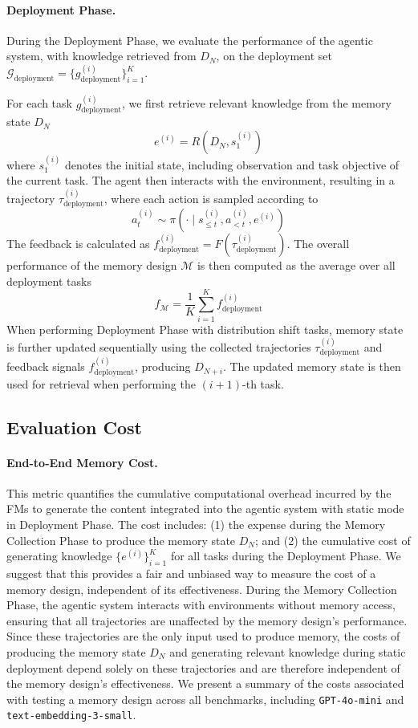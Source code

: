 \documentclass{article}
\theoremstyle{plain}
\theoremstyle{definition}
\theoremstyle{remark}
\begin{document}
\paragraph{Deployment Phase.} 
During the Deployment Phase, we evaluate the performance of the agentic system, with knowledge retrieved from $D_N$, 
on the deployment set $\mathcal{G}_{\text{deployment}} = \{ g^{(i)}_{\text{deployment}} \}_{i=1}^K$.

For each task $g^{(i)}_{\text{deployment}}$, we first retrieve relevant knowledge from the memory state $D_N$
\[
e^{(i)} = R(D_N, s^{(i)}_{1})
\]
where $s^{(i)}_{1}$ denotes the initial state, including observation and task objective of the current task. 
The agent then interacts with the environment, resulting in a trajectory $\tau^{(i)}_{\text{deployment}}$, where each action is sampled according to
\[
a^{(i)}_t \sim \pi(\cdot \mid s^{(i)}_{\le t}, a^{(i)}_{<t}, e^{(i)})
\]
The feedback is calculated as $f^{(i)}_{\text{deployment}} = F(\tau^{(i)}_{\text{deployment}})$. 
The overall performance of the memory design $\mathcal{M}$ is then computed as the average over all deployment tasks
\[
f_{\mathcal{M}} = \frac{1}{K}\sum_{i=1}^K f^{(i)}_{\text{deployment}}
\]
When performing Deployment Phase with distribution shift tasks, memory state is further updated sequentially using the collected trajectories $\tau^{(i)}_{\text{deployment}}$ 
and feedback signals $f^{(i)}_{\text{deployment}}$, producing $D_{N+i}$. 
The updated memory state is then used for retrieval when performing the $(i+1)$-th task.

\subsection{Evaluation Cost}
\label{eval_cost}
\paragraph{End-to-End Memory Cost.} This metric quantifies the cumulative computational overhead incurred by the FMs to generate the content integrated into the agentic system with static mode in Deployment Phase. The cost includes: (1) the expense during the Memory Collection Phase to produce the memory state $D_N$; and (2) the cumulative cost of generating knowledge $\{e^{(i)}\}_{i=1}^K$ for all tasks during the Deployment Phase. We suggest that this provides a fair and unbiased way to measure the cost of a memory design, independent of its effectiveness. During the Memory Collection Phase, the agentic system interacts with environments without memory access, ensuring that all trajectories are unaffected by the memory design’s performance. Since these trajectories are the only input used to produce memory, the costs of producing the memory state $D_N$ and generating relevant knowledge during static deployment depend solely on these trajectories and are therefore independent of the memory design’s effectiveness. We present a summary of the costs associated with testing a memory design across all benchmarks, including \texttt{GPT-4o-mini} and \texttt{text-embedding-3-small}. 
\end{document}
